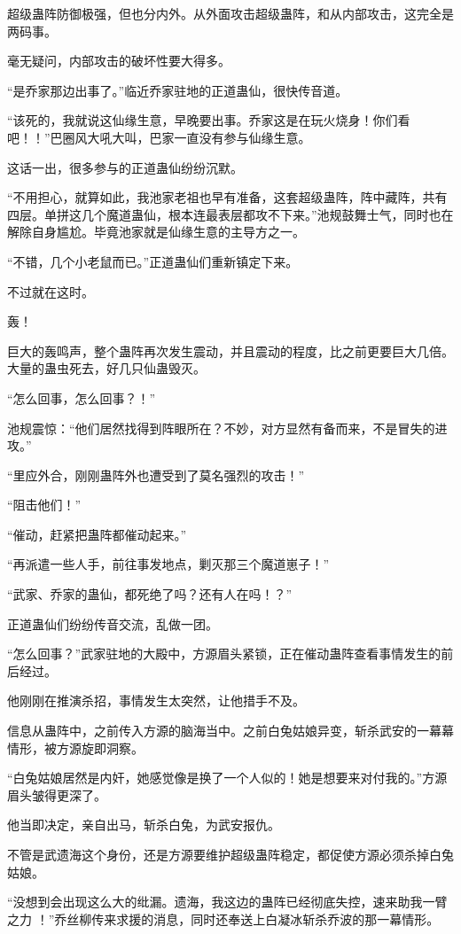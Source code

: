 \begin{this_body}
超级蛊阵防御极强，但也分内外。从外面攻击超级蛊阵，和从内部攻击，这完全是两码事。

毫无疑问，内部攻击的破坏性要大得多。

“是乔家那边出事了。”临近乔家驻地的正道蛊仙，很快传音道。

“该死的，我就说这仙缘生意，早晚要出事。乔家这是在玩火烧身！你们看吧！！”巴圈风大吼大叫，巴家一直没有参与仙缘生意。

这话一出，很多参与的正道蛊仙纷纷沉默。

“不用担心，就算如此，我池家老祖也早有准备，这套超级蛊阵，阵中藏阵，共有四层。单拼这几个魔道蛊仙，根本连最表层都攻不下来。”池规鼓舞士气，同时也在解除自身尴尬。毕竟池家就是仙缘生意的主导方之一。

“不错，几个小老鼠而已。”正道蛊仙们重新镇定下来。

不过就在这时。

轰！

巨大的轰鸣声，整个蛊阵再次发生震动，并且震动的程度，比之前更要巨大几倍。大量的蛊虫死去，好几只仙蛊毁灭。

“怎么回事，怎么回事？！”

池规震惊：“他们居然找得到阵眼所在？不妙，对方显然有备而来，不是冒失的进攻。”

“里应外合，刚刚蛊阵外也遭受到了莫名强烈的攻击！”

“阻击他们！”

“催动，赶紧把蛊阵都催动起来。”

“再派遣一些人手，前往事发地点，剿灭那三个魔道崽子！”

“武家、乔家的蛊仙，都死绝了吗？还有人在吗！？”

正道蛊仙们纷纷传音交流，乱做一团。

“怎么回事？”武家驻地的大殿中，方源眉头紧锁，正在催动蛊阵查看事情发生的前后经过。

他刚刚在推演杀招，事情发生太突然，让他措手不及。

信息从蛊阵中，之前传入方源的脑海当中。之前白兔姑娘异变，斩杀武安的一幕幕情形，被方源旋即洞察。

“白兔姑娘居然是内奸，她感觉像是换了一个人似的！她是想要来对付我的。”方源眉头皱得更深了。

他当即决定，亲自出马，斩杀白兔，为武安报仇。

不管是武遗海这个身份，还是方源要维护超级蛊阵稳定，都促使方源必须杀掉白兔姑娘。

“没想到会出现这么大的纰漏。遗海，我这边的蛊阵已经彻底失控，速来助我一臂之力 ！”乔丝柳传来求援的消息，同时还奉送上白凝冰斩杀乔波的那一幕情形。


\end{this_body}
